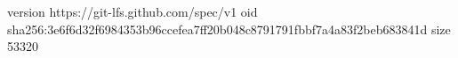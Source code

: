 version https://git-lfs.github.com/spec/v1
oid sha256:3e6f6d32f6984353b96ccefea7ff20b048c8791791fbbf7a4a83f2beb683841d
size 53320
